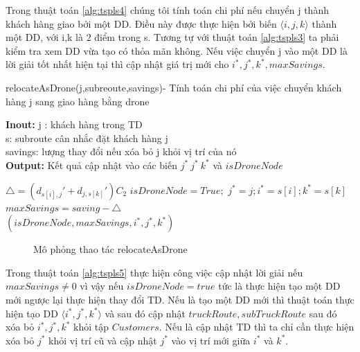 \documentclass[a4paper,12pt]{report}
\begin{document}
Trong thuật toán \ref{alg:tspls4} chúng tôi tính toán chi phí nếu chuyển j thành khách hàng giao bởi một DD. Điều này được thực hiện bởi biến $\langle i,j,k \rangle$ thành một DD, với i,k là 2 điểm trong s. Tương tự với thuật toán \ref{alg:tspls3} ta phải kiểm tra xem DD vừa tạo có thỏa mãn không. Nếu việc chuyển j vào một DD là lời giải tốt nhất hiện tại thì cập nhật  giá trị mới cho $i^*,j^*,k^*, maxSavings$.\\

\begin{algorithm}[H]
\caption{relocateAsDrone(j,subreoute,savings)- Tính toán chi phí của việc chuyển khách hàng j sang giao hàng bằng drone}
\textbf{Inout:} j : khách hàng trong TD\\ s: subroute cân nhắc đặt khách hàng j \\ savings: lượng thay đổi nếu xóa bỏ j khỏi vị trí của nó\\

\textbf{Output:} Kết quả cập nhật vào các biến $j^* \ j^* \ k^*$ và $isDroneNode$
\begin{algorithmic}[1]
\State$\triangle =(d_{s[i],j}'+d_{j,s[k]}')C_2$
\State $isDroneNode=True;$
\State  $j^*=j;i^*=s[i];k^*=s[k]$
\State $maxSavings=saving-\triangle$
\EndIf
\EndIf
\EndFor
\EndFor\\
\Return 	$(isDroneNode,maxSavings,i^*,j^*,k^*)$
\end{algorithmic}

\label{alg:tspls4}
\end{algorithm}
\begin{figure}[H]

\caption{Mô phỏng thao tác relocateAsDrone}\label{reloAsDrone}
\end{figure}
Trong thuật toán \ref{alg:tspls5} thực hiện công việc cập nhật lời giải nếu $maxSavings \neq 0$ vì vậy nếu $isDroneNode=true $ tức là thực hiện tạo một DD mới ngược lại thực hiện thay đổi TD. Nếu là tạo một DD mới thì thuật toán thực hiện tạo DD $\langle i^*,j^*,k^* \rangle$ và sau đó cập nhật $truckRoute,subTruckRoute$ sau đó xóa bỏ $i^*,j^*,k^*$ khỏi tập $Customers$. Nếu là cập nhật TD thì ta chỉ cần thực hiện xóa bỏ $j^*$ khỏi vị trí cũ và cập nhật $j^*$ vào vị trí mới giữa $i^*$ và $k^*$. \\
\end{document}
